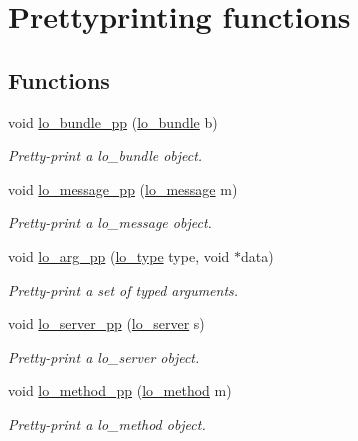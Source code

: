 \hypertarget{group__pp}{\section{\-Prettyprinting functions}
\label{group__pp}
}
\subsection*{\-Functions}
\begin{DoxyCompactItemize}
\item 
void \hyperlink{group__pp_ga97e508300ee8b57d4ba1f20a1c4d0235}{lo\-\_\-bundle\-\_\-pp} (\hyperlink{lo__types_8h_a96254950ad34e9cfbf8a6613fc74025b}{lo\-\_\-bundle} b)
\begin{DoxyCompactList}\small\item\em \-Pretty-\/print a lo\-\_\-bundle object. \end{DoxyCompactList}\item 
void \hyperlink{group__pp_ga5fa7f79f6f490d9a462d6cd894df3b76}{lo\-\_\-message\-\_\-pp} (\hyperlink{lo__types_8h_ad126083c98d941f00eb72d1690b38d63}{lo\-\_\-message} m)
\begin{DoxyCompactList}\small\item\em \-Pretty-\/print a lo\-\_\-message object. \end{DoxyCompactList}\item 
void \hyperlink{group__pp_ga1699678a3a2d4221bb55fa2e05326ef0}{lo\-\_\-arg\-\_\-pp} (\hyperlink{group__liblo_ga11838c576b0197c255ce805fd7434736}{lo\-\_\-type} type, void $\ast$data)
\begin{DoxyCompactList}\small\item\em \-Pretty-\/print a set of typed arguments. \end{DoxyCompactList}\item 
void \hyperlink{group__pp_ga31b1944c9f06645d87bdffbf769a1945}{lo\-\_\-server\-\_\-pp} (\hyperlink{lo__types_8h_a59067bf50cf8abb4371da6f03c9036c9}{lo\-\_\-server} s)
\begin{DoxyCompactList}\small\item\em \-Pretty-\/print a lo\-\_\-server object. \end{DoxyCompactList}\item 
void \hyperlink{group__pp_ga220be2c9f4cfe4516ebcb5c4687a2b9f}{lo\-\_\-method\-\_\-pp} (\hyperlink{lo__types_8h_a66faedf5da13231d8c0166870477dce5}{lo\-\_\-method} m)
\begin{DoxyCompactList}\small\item\em \-Pretty-\/print a lo\-\_\-method object. \end{DoxyCompactList}\item 

\end{DoxyCompactItemize}
